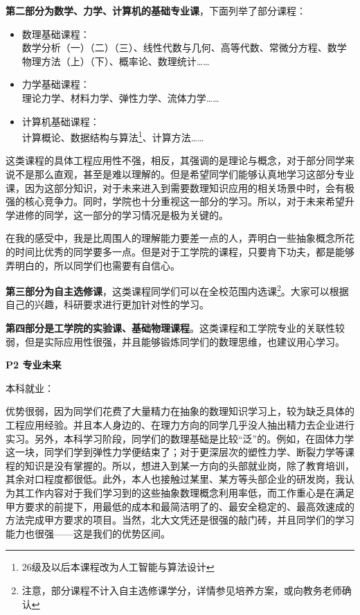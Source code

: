 \textbf{第二部分为数学、力学、计算机的基础专业课}，下面列举了部分课程：
\begin{itemize}
	\item 数理基础课程：\\数学分析（一）（二）（三）、线性代数与几何、高等代数、常微分方程、数学物理方法（上）（下）、概率论、数理统计……
	\item 力学基础课程：\\理论力学、材料力学、弹性力学、流体力学……
	\item 计算机基础课程：\\计算概论、数据结构与算法\footnote{26级及以后本课程改为人工智能与算法设计}、计算方法……
\end{itemize}

这类课程的具体工程应用性不强，相反，其强调的是理论与概念，对于部分同学来说不是那么直观，甚至是难以理解的。但是希望同学们能够认真地学习这部分专业课，因为这部分知识，对于未来进入到需要数理知识应用的相关场景中时，会有极强的核心竞争力。同时，学院也十分重视这一部分的学习。所以，对于未来希望升学进修的同学，这一部分的学习情况是极为关键的。

\vspace{10pt}

在我的感受中，我是比周围人的理解能力要差一点的人，弄明白一些抽象概念所花的时间比优秀的同学要多一点。但是对于工学院的课程，只要肯下功夫，都是能够弄明白的，所以同学们也需要有自信心。

\vspace{10pt}

\textbf{第三部分为自主选修课}，这类课程同学们可以在全校范围内选课\footnote{注意，部分课程不计入自主选修课学分，详情参见培养方案，或向教务老师确认}。大家可以根据自己的兴趣，科研要求进行更加针对性的学习。

\vspace{10pt}

\textbf{第四部分是工学院的实验课、基础物理课程}。这类课程和工学院专业的关联性较弱，但是实际应用性很强，并且能够锻炼同学们的数理思维，也建议用心学习。

\vspace{10pt}

\textbf{P2 专业未来}

本科就业：

优势很弱，因为同学们花费了大量精力在抽象的数理知识学习上，较为缺乏具体的工程应用经验。并且本人身边的、在理力方向的同学几乎没人抽出精力去企业进行实习。另外，本科学习阶段，同学们的数理基础是比较“泛”的。例如，在固体力学这一块，同学们学到弹性力学便结束了；对于更深层次的塑性力学、断裂力学等课程的知识是没有掌握的。所以，想进入到某一方向的头部就业岗，除了教育培训，其余对口程度都很低。此外，本人也接触过某里、某方等头部企业的研发岗，我认为其工作内容对于我们学习到的这些抽象数理概念利用率低，而工作重心是在满足甲方要求的前提下，用最低的成本和最简洁明了的、最安全稳定的、最高效速成的方法完成甲方要求的项目。当然，北大文凭还是很强的敲门砖，并且同学们的学习能力也很强——这是我们的优势区间。

